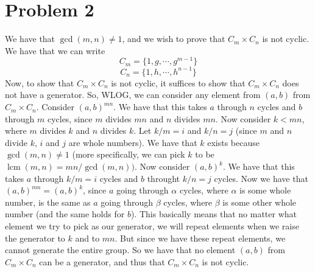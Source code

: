 \documentclass{article}
\DeclareMathOperator{\lcm}{lcm}
\begin{document}
\section*{Problem 2}
We have that $\gcd (m,n) \neq 1$, and we wish to prove that $C_m \times C_n$
is not cyclic. We have that we can write
\[ C_m = \{1, g, \cdots, g^{m-1} \} \]
\[ C_n = \{1, h, \cdots, h^{n-1} \} \]
Now, to show that $C_m \times C_n$ is not cyclic, it suffices to show that
$C_m \times C_n$ does not have a generator. So, WLOG, we can consider any
element from $(a,b)$ from $C_m \times C_n$. Consider $(a,b)^{mn}$. We have
that this takes $a$ through $n$ cycles and $b$ through $m$ cycles, since $m$
divides $mn$ and $n$ divides $mn$. Now consider $k < mn$, where $m$ divides $k$
and $n$ divides $k$. Let $k/m = i$ and $k/n = j$ (since $m$ and $n$ divide $k$,
$i$ and $j$ are whole numbers). We have that $k$ exists
because $\gcd (m,n) \neq 1$ (more specifically, we can pick $k$ to be
$\lcm (m,n) = mn / \gcd(m,n))$. Now consider $(a,b)^{k}$. We have that
this takes $a$ through $k/m = i$ cycles and $b$ throught $k/n = j$ cycles.
Now we have that $(a,b)^{mn} = (a,b)^{k}$, since $a$ going through $\alpha$ cycles,
where $\alpha$ is some whole number, is the same as $a$ going through
$\beta$ cycles, where $\beta$ is some other whole number (and the same holds
for $b$). This basically means that no matter what element we try to pick
as our generator, we will repeat elements when we raise the generator
to $k$ and to $mn$. But since we have these repeat elements, we cannot generate
the entire group. So we have that no element $(a,b)$ from $C_m \times C_n$ can
be a generator, and thus that $C_m \times C_n$ is not cyclic.
\end{document}
